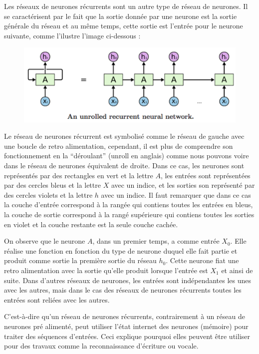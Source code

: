 \documentclass[conference,onecolumn]{IEEEtran}
\begin{document}
Les réseaux de neurones récurrents sont un autre type de réseau de neurones. Il se caractérisent par le fait que la sortie donnée par une neurone est la sortie générale du réseau et au même temps, cette sortie est l’entrée pour le neurone suivante, comme l'ilustre l'image ci-dessous : 

 \begin{figure}[H]
 \centering
    \includegraphics[scale=0.5]{img14.png}
\end{figure}


Le réseau de neurones récurrent est symbolisé comme le réseau de gauche avec une boucle de retro alimentation, cependant, il est plus de comprendre son fonctionnement en la “déroulant” (unroll en anglais) comme nous pouvons voire dans le réseau de neurones équivalent de droite. Dans ce cas, les neurones sont représentés par des rectangles en vert et la lettre $A$, les entrées sont représentées par des cercles bleus et la lettre $X$ avec un indice, et les sorties son représenté par des cercles violets et la lettre $h$ avec un indice. Il faut remarquer que dans ce cas la couche d’entrée correspond à la rangée qui contiens toutes les entrées en bleus, la couche de sortie correspond à la rangé supérieure qui contiens toutes les sorties en violet et la couche restante est la seule couche cachée. 

On observe que le neurone $A$, dans un premier temps, a comme entrée $X_0$. Elle réalise une fonction en fonction du type de neurone duquel elle fait partie et produit comme sortie la première sortie du réseau $h_0$.  Cette neurone fiat une retro alimentation avec la sortie qu’elle produit lorsque l’entrée est $X_1$ et ainsi de suite. Dans d’autres réseaux de neurones, les entrées sont indépendantes les unes avec les autres, mais dans le cas des réseaux de neurones récurrents toutes les entrées sont reliées avec les autres. 

C’est-à-dire qu'un réseau de neurones récurrents, contrairement à un réseau de neurones pré alimenté, peut utiliser l’état internet des neurones (mémoire) pour traiter des séquences d’entrées. Ceci explique pourquoi elles peuvent être utiliser pour des travaux comme la reconnaissance d’écriture ou vocale. 
\end{document}
